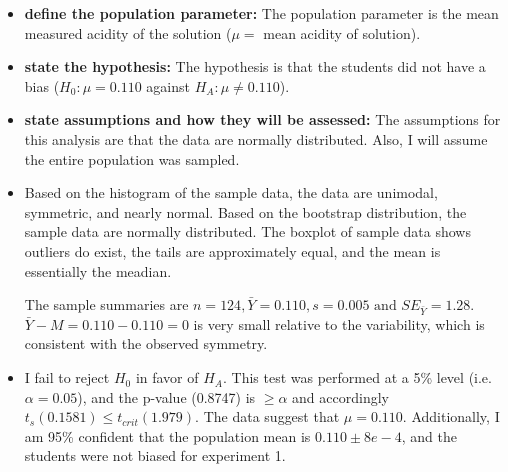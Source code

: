 \documentclass{article}\usepackage[]{graphicx}\usepackage[]{color}
\begin{document}
\begin{itemize}
  \item \textbf{define the population parameter:} The population parameter is
  the mean measured acidity of the solution ($\mu = $ mean acidity of solution).

  \item \textbf{state the hypothesis:}  The hypothesis is that the students did
  not have a bias ($H_0: \mu = 0.110$ against $H_A: \mu \neq 0.110$).

  \item \textbf{state assumptions and how they will be assessed:}  The assumptions for
  this analysis are that the data are normally distributed.  Also, I will
  assume the entire population was sampled.

  \item
  Based on the histogram of the sample data, the data are unimodal, symmetric,
  and nearly normal.  Based on the bootstrap distribution, the sample data are
  normally distributed.  The boxplot of sample data shows outliers
  do exist, the tails are approximately equal, and the mean is essentially the meadian.

  The sample summaries are $n = 124, \bar{Y} = 0.110, s = 0.005 \text{ and }
  SE_{\bar{Y}} = 1.28$.  $\bar{Y} - M = 0.110 - 0.110 = 0$ is very small
  relative to the variability, which is consistent with the observed symmetry.

  \item
  I fail to reject $H_0$ in favor of $H_A$.  This test was performed at a 5\% level
  (i.e. $\alpha = 0.05$), and the p-value (0.8747) is $\ge \alpha$ and
  accordingly $t_s (0.1581) \le t_{crit}(1.979)$.  The data suggest that
  $\mu = 0.110$.  Additionally, I am 95\% confident that the population
  mean is $0.110 \pm 8e-4$, and the students were not biased for experiment 1.
\end{itemize}
\end{document}
